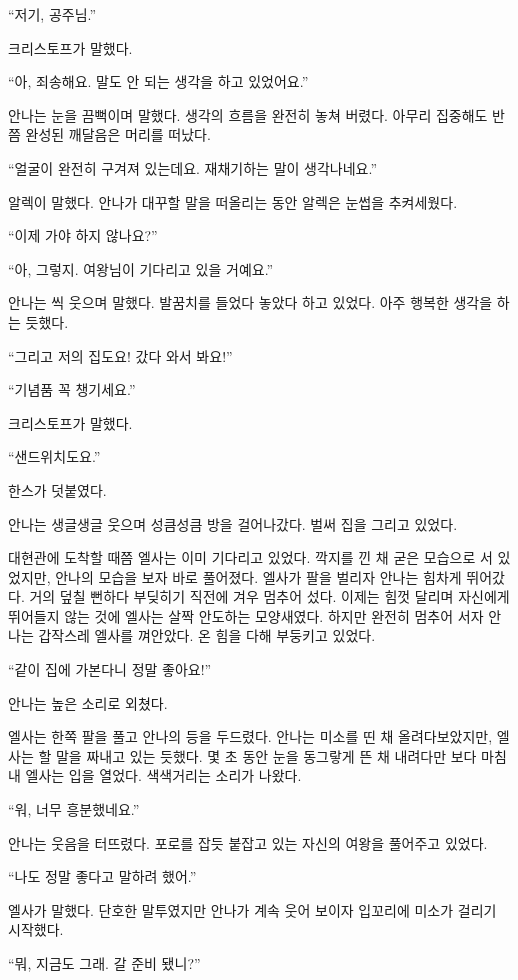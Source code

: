 ``저기, 공주님.''

크리스토프가 말했다.

``아, 죄송해요. 말도 안 되는 생각을 하고 있었어요.''

안나는 눈을 끔뻑이며 말했다. 생각의 흐름을 완전히 놓쳐 버렸다. 아무리 집중해도 반쯤 완성된 깨달음은 머리를 떠났다.

``얼굴이 완전히 구겨져 있는데요. 재채기하는 말이 생각나네요.''

알렉이 말했다. 안나가 대꾸할 말을 떠올리는 동안 알렉은 눈썹을 추켜세웠다.

``이제 가야 하지 않나요?''

``아, 그렇지. 여왕님이 기다리고 있을 거예요.''

안나는 씩 웃으며 말했다. 발꿈치를 들었다 놓았다 하고 있었다. 아주 행복한 생각을 하는 듯했다.

``그리고 저의 집도요! 갔다 와서 봐요!''

``기념품 꼭 챙기세요.''

크리스토프가 말했다.

``샌드위치도요.''

한스가 덧붙였다.

안나는 생글생글 웃으며 성큼성큼 방을 걸어나갔다. 벌써 집을 그리고 있었다.

\textbreak

대현관에 도착할 때쯤 엘사는 이미 기다리고 있었다. 깍지를 낀 채 굳은 모습으로 서 있었지만, 안나의 모습을 보자 바로 풀어졌다. 엘사가 팔을 벌리자 안나는 힘차게 뛰어갔다. 거의 덮칠 뻔하다 부딪히기 직전에 겨우 멈추어 섰다. 이제는 힘껏 달리며 자신에게 뛰어들지 않는 것에 엘사는 살짝 안도하는 모양새였다. 하지만 완전히 멈추어 서자 안나는 갑작스레 엘사를 껴안았다. 온 힘을 다해 부둥키고 있었다.

``같이 집에 가본다니 정말 좋아요!''

안나는 높은 소리로 외쳤다.

엘사는 한쪽 팔을 풀고 안나의 등을 두드렸다. 안나는 미소를 띤 채 올려다보았지만, 엘사는 할 말을 짜내고 있는 듯했다. 몇 초 동안 눈을 동그랗게 뜬 채 내려다만 보다 마침내 엘사는 입을 열었다. 색색거리는 소리가 나왔다.

``워, 너무 흥분했네요.''

안나는 웃음을 터뜨렸다. 포로를 잡듯 붙잡고 있는 자신의 여왕을 풀어주고 있었다.

``나도 정말 좋다고 말하려 했어.''

엘사가 말했다. 단호한 말투였지만 안나가 계속 웃어 보이자 입꼬리에 미소가 걸리기 시작했다.

``뭐, 지금도 그래. 갈 준비 됐니?''

